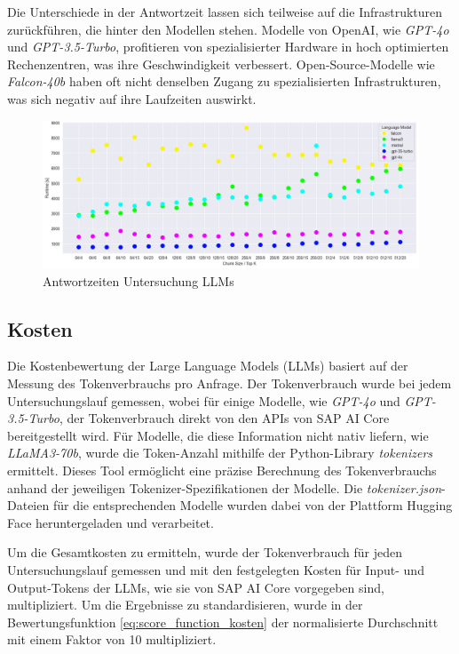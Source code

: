 Die Unterschiede in der Antwortzeit lassen sich teilweise auf die Infrastrukturen zurückführen, die hinter den Modellen stehen. 
Modelle von OpenAI, wie \textit{GPT-4o} und \textit{GPT-3.5-Turbo}, profitieren von spezialisierter Hardware in hoch optimierten Rechenzentren, was ihre Geschwindigkeit verbessert. 
Open-Source-Modelle wie \textit{Falcon-40b} haben oft nicht denselben Zugang zu spezialisierten Infrastrukturen, was sich negativ auf ihre Laufzeiten auswirkt.

\begin{figure}[H]
    \centering
    \includegraphics[width=1\textwidth]{img/antwortzeit.png}
    \caption{Antwortzeiten Untersuchung \acp{LLM}}
    \label{fig:antwortzeit}
\end{figure}

\subsection{Kosten}

Die Kostenbewertung der Large Language Models (\acp{LLM}) basiert auf der Messung des Tokenverbrauchs pro Anfrage. 
Der Tokenverbrauch wurde bei jedem Untersuchungslauf gemessen, wobei für einige Modelle, wie \textit{GPT-4o} und \textit{GPT-3.5-Turbo}, der Tokenverbrauch direkt von den \acp{API} von SAP AI Core bereitgestellt wird. 
Für Modelle, die diese Information nicht nativ liefern, wie \textit{LLaMA3-70b}, wurde die Token-Anzahl mithilfe der Python-Library \textit{tokenizers} ermittelt. 
Dieses Tool ermöglicht eine präzise Berechnung des Tokenverbrauchs anhand der jeweiligen Tokenizer-Spezifikationen der Modelle. 
Die \textit{tokenizer.json}-Dateien für die entsprechenden Modelle wurden dabei von der Plattform Hugging Face heruntergeladen und verarbeitet.

Um die Gesamtkosten zu ermitteln, wurde der Tokenverbrauch für jeden Untersuchungslauf gemessen und mit den festgelegten Kosten für Input- und Output-Tokens der \acp{LLM}, wie sie von SAP AI Core vorgegeben sind, multipliziert. Um die Ergebnisse zu standardisieren, 
wurde in der Bewertungsfunktion \ref{eq:score_function_kosten} der normalisierte Durchschnitt mit einem Faktor von 10 multipliziert.

